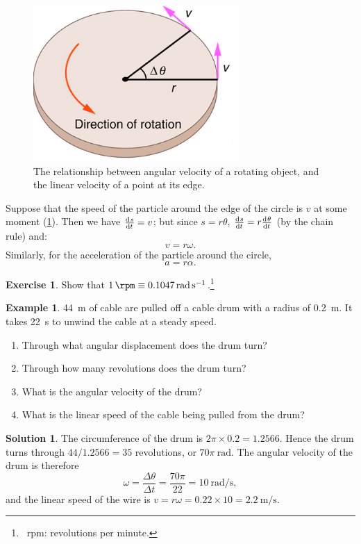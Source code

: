 \documentclass[a4paper]{amsbook}
\theoremstyle{definition}
\newtheorem*{example}{Example}
\newtheorem{exercise}{Exercise}
\numberwithin{exercise}{chapter}
\numberwithin{exercise}{chapter}
\newtheorem*{solution}{Solution}
\begin{document}
\begin{figure}
  \centering
  \includegraphics[width=0.7\textwidth]{angvelocity}
  \caption{The relationship between angular velocity of a rotating object, and the linear velocity of a point at its edge.\label{fig:angvelocity}}
\end{figure}

Suppose that the speed of the particle around the edge of the circle is $ v $ at some moment (\cref{fig:angvelocity}). Then we have $ \od{s}{t} = v $;
but since $ s = r\theta $, $ \od{s}{t} = r\od{\theta}{t} $ (by the chain rule) and:
\begin{equation}
  v = r\omega.
\end{equation}
Similarly, for the acceleration of the particle around the circle,
\begin{equation}
  a = r\alpha.
\end{equation}

\begin{exercise}
  Show that $ \SI{1}{\rpm} \equiv \SI{0.1047}{\radian\per\second} $.\footnote{~rpm: revolutions per minute.}
\end{exercise}

\begin{example}
  \SI{44}{\metre} of cable are pulled off a cable drum with a radius of \SI{0.2}{\metre}. It takes \SI{22}{\second} to unwind
  the cable at a steady speed.
  \begin{enumerate}
    \item Through what angular displacement does the drum turn?
    \item Through how many revolutions does the drum turn?
    \item What is the angular velocity of the drum?
    \item What is the linear speed of the cable being pulled from the drum?
  \end{enumerate}
\end{example}
\begin{solution}
  The circumference of the drum is $ 2\pi \times 0.2 = 1.2566 $. Hence the drum turns through $ 44/1.2566 = 35 $ revolutions,
  or $ 70\pi~\si{\radian} $. The angular velocity of the drum is therefore
  \begin{displaymath}
    \omega = \frac{\Delta \theta}{\Delta t} = \frac{70\pi}{22} = \SI{10}{\radian\per\second},
  \end{displaymath}
  and the linear speed of the wire is $ v = r\omega = 0.22 \times 10 = \SI{2.2}{\metre\per\second} $.
\end{solution}
\end{document}
